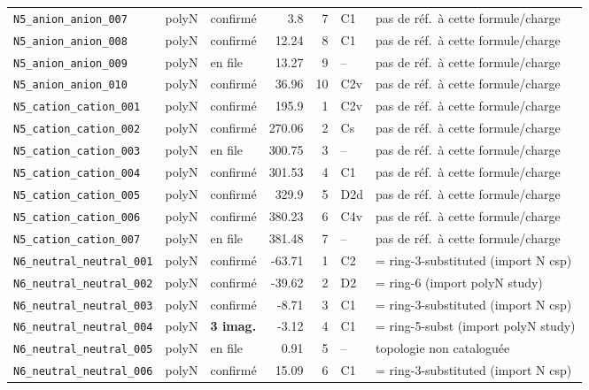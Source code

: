\begin{longtable}{@{}p{4.2cm}cp{1.3cm}rrp{1.2cm}p{2.6cm}@{}}
\texttt{N5\_anion\_anion\_007} & polyN & confirm\'e & 3.8 & 7 & C1 & pas de r\'ef.\ \`a cette formule/charge \\
\texttt{N5\_anion\_anion\_008} & polyN & confirm\'e & 12.24 & 8 & C1 & pas de r\'ef.\ \`a cette formule/charge \\
\texttt{N5\_anion\_anion\_009} & polyN & en file & 13.27 & 9 & -- & pas de r\'ef.\ \`a cette formule/charge \\
\texttt{N5\_anion\_anion\_010} & polyN & confirm\'e & 36.96 & 10 & C2v & pas de r\'ef.\ \`a cette formule/charge \\
\addlinespace
\texttt{N5\_cation\_cation\_001} & polyN & confirm\'e & 195.9 & 1 & C2v & pas de r\'ef.\ \`a cette formule/charge \\
\texttt{N5\_cation\_cation\_002} & polyN & confirm\'e & 270.06 & 2 & Cs & pas de r\'ef.\ \`a cette formule/charge \\
\texttt{N5\_cation\_cation\_003} & polyN & en file & 300.75 & 3 & -- & pas de r\'ef.\ \`a cette formule/charge \\
\texttt{N5\_cation\_cation\_004} & polyN & confirm\'e & 301.53 & 4 & C1 & pas de r\'ef.\ \`a cette formule/charge \\
\texttt{N5\_cation\_cation\_005} & polyN & confirm\'e & 329.9 & 5 & D2d & pas de r\'ef.\ \`a cette formule/charge \\
\texttt{N5\_cation\_cation\_006} & polyN & confirm\'e & 380.23 & 6 & C4v & pas de r\'ef.\ \`a cette formule/charge \\
\texttt{N5\_cation\_cation\_007} & polyN & en file & 381.48 & 7 & -- & pas de r\'ef.\ \`a cette formule/charge \\
\addlinespace
\texttt{N6\_neutral\_neutral\_001} & polyN & confirm\'e & -63.71 & 1 & C2 & = ring-3-substituted (import N csp) \\
\texttt{N6\_neutral\_neutral\_002} & polyN & confirm\'e & -39.62 & 2 & D2 & = ring-6 (import polyN study) \\
\texttt{N6\_neutral\_neutral\_003} & polyN & confirm\'e & -8.71 & 3 & C1 & = ring-3-substituted (import N csp) \\
\texttt{N6\_neutral\_neutral\_004} & polyN & \textbf{3 imag.} & -3.12 & 4 & C1 & = ring-5-subst (import polyN study) \\
\texttt{N6\_neutral\_neutral\_005} & polyN & en file & 0.91 & 5 & -- & topologie non catalogu\'ee \\
\texttt{N6\_neutral\_neutral\_006} & polyN & confirm\'e & 15.09 & 6 & C1 & = ring-3-substituted (import N csp) \\

\end{longtable}
